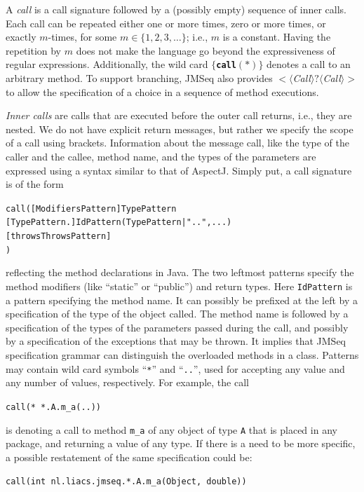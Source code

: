 A \textsl{call} is a call signature followed by a (possibly empty) sequence of
inner calls. Each call can be repeated either one or more times, zero or more
times, or exactly $m$-times, for some $m \in \{1, 2, 3, \ldots \}$;
i.e., $m$ is a constant. 
Having the repetition by $m$ does not make the language go beyond the expressiveness of regular expressions.
Additionally, the wild card 
{\small$\{$\textbf{\texttt{call}}$(*)\}$} denotes a call to an arbitrary method.
To support branching, JMSeq also provides
$<\langle$\textsl{Call}$\rangle ? \langle$\textsl{Call}$\rangle>$ to allow the
specification of a choice in a sequence of method executions.

\textsl{Inner calls} are calls that are executed before the outer
call returns, i.e., they are nested. 
We do not have explicit return messages, but rather we specify the scope of a call  using brackets. 
Information about the message call, like the type of the caller and the callee, method
name, and the types of the parameters are expressed using a syntax similar to that of AspectJ. 
Simply put, a call signature is of the form
\begin{alltt}
\small
\texttt{call}([ModifiersPattern] TypePattern
        [TypePattern . ] IdPattern (TypePattern | ".." , ... )
        [ throws ThrowsPattern ]
)
\end{alltt}
reflecting the method declarations in Java.
The two leftmost patterns specify the method modifiers (like   ``static'' or ``public'') and return types.
Here \texttt{IdPattern} is a pattern specifying the method name. It can possibly
be prefixed at the left by a specification of the type of the object called.
The method name is followed by a specification of the types of the parameters
passed during the call, and possibly by a specification of the exceptions that may be thrown.
It implies that JMSeq specification grammar can distinguish the overloaded
methods in a class. Patterns may contain wild card symbols ``\texttt{*}'' and
``\texttt{..}'', used for accepting any value and any number of values,
respectively. For example, the call
\begin{alltt}
\centering\small
\texttt{call(* *.A.m\_a(..))}
\end{alltt}
is denoting a call to method \texttt{m\_a} of any object of type \texttt{A}
that is placed in any package, and returning a value of any type. If there is a
need to be more specific, a possible restatement of the same specification
could be:
\begin{alltt}
\centering\small
\texttt{call(int nl.liacs.jmseq.*.A.m_a(Object, double))}
\end{alltt}

